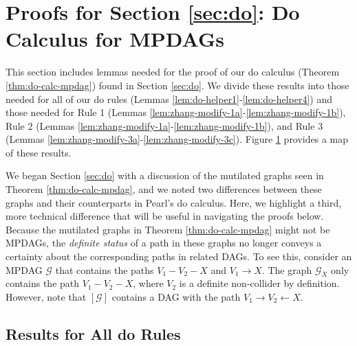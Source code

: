 \documentclass[11pt]{article}
\newcommand{\g}[1][G]{\mathcal{#1}}
\begin{document}
\section{Proofs for Section \ref{sec:do}: Do Calculus for MPDAGs}
\label{app:do}

This section includes lemmas needed for the proof of our do calculus (Theorem \ref{thm:do-calc-mpdag}) found in Section \ref{sec:do}. We divide these results into those needed for all of our do rules (Lemmas \ref{lem:do-helper1}-\ref{lem:do-helper4}) and those needed for Rule 1 (Lemmas \ref{lem:zhang-modify-1a}-\ref{lem:zhang-modify-1b}), Rule 2 (Lemmas \ref{lem:zhang-modify-1a}-\ref{lem:zhang-modify-1b}), and Rule 3 (Lemmas \ref{lem:zhang-modify-3a}-\ref{lem:zhang-modify-3c}). Figure \ref{fig:do-map} provides a map of these results.

We began Section \ref{sec:do} with a discussion of the mutilated graphs seen in Theorem \ref{thm:do-calc-mpdag}, and we noted two differences between these graphs and their counterparts in Pearl's do calculus. Here, we highlight a third, more technical difference that will be useful in navigating the proofs below. Because the mutilated graphs in Theorem \ref{thm:do-calc-mpdag} might not be MPDAGs, the \textit{definite status} of a path in these graphs no longer conveys a certainty about the corresponding paths in related DAGs. To see this, consider an MPDAG $\g$ that contains the paths $V_1 - V_2 - X$ and $V_1 \to X$. The graph $\g_{\overline{X}}$ only contains the path $V_1 - V_2 - X$, where $V_2$ is a definite non-collider by definition. However, note that $[\g]$ contains a DAG with the path $V_1 \to V_2 \gets X$.



\begin{figure}[omitted: a diagram of this paper's results, not reproduced here]\label{fig:do-map}\end{figure}



\subsection{Results for All do Rules}

\end{document}
